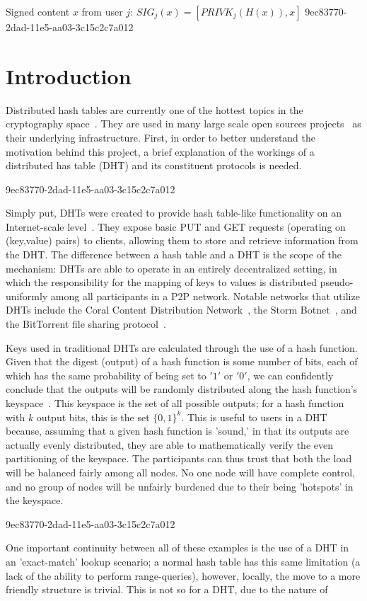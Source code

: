 \documentclass[12pt]{article}
\begin{document}
Signed content $x$ from user $j$: $SIG_j(x) = \left[ PRIVK_j( H(x) ), x \right]$
9ec83770-2dad-11e5-aa03-3c15c2c7a012
\section{Introduction}
\par Distributed hash tables are currently one of the hottest topics in the cryptography space~\cite{Stoica:2001dj,Rowstron:2001ea,Ratnasamy:2001wn}. They are used in many large scale open sources projects~\cite{Freitas:2013tb,Xu:2010vs,Perfitt:2010fh} as their underlying infrastructure. First, in order to better understand the motivation behind this project, a brief explanation of the workings of a distributed has table (DHT) and its constituent protocols is needed.

9ec83770-2dad-11e5-aa03-3c15c2c7a012\par Simply put, DHTs were created to provide hash table-like functionality on an Internet-scale level~\cite{Ratnasamy:2001wn}. They expose basic PUT and GET requests (operating on (key,value) pairs) to clients, allowing them to store and retrieve information from the DHT. The difference between a hash table and a DHT is the scope of the mechanism: DHTs are able to operate in an entirely decentralized setting, in which the responsibility for the mapping of keys to values is distributed pseudo-uniformly among all participants in a P2P network. Notable networks that utilize DHTs include the Coral Content Distribution Network~\cite{Freedman:2004vb}, the Storm Botnet~\cite{Holz:2008uk}, and the BitTorrent file sharing protocol~\cite{Cohen:y1_8mBnw}.

\par Keys used in traditional DHTs are calculated through the use of a hash function. Given that the digest (output) of a hash function is some number of bits, each of which has the same probability of being set to $'1'$ or $'0'$, we can confidently conclude that the outputs will be randomly distributed along the hash function's keyspace~. This keyspace is the set of all possible outputs; for a hash function with $k$ output bits, this is the set $\{0,1\}^k$. This is useful to users in a DHT because, assuming that a given hash function is 'sound,' in that its outputs are actually evenly distributed, they are able to mathematically verify the even partitioning of the keyspace. The participants can thus trust that both the load will be balanced fairly among all nodes. No one node will have complete control, and no group of nodes will be unfairly burdened due to their being 'hotspots' in the keyspace.~

9ec83770-2dad-11e5-aa03-3c15c2c7a012\par One important continuity between all of these examples is the use of a DHT in an 'exact-match' lookup scenario; a normal hash table has this same limitation (a lack of the ability to perform range-queries), however, locally, the move to a more friendly structure is trivial. This is not so for a DHT, due to the nature of
\printbibliography
\end{document}
